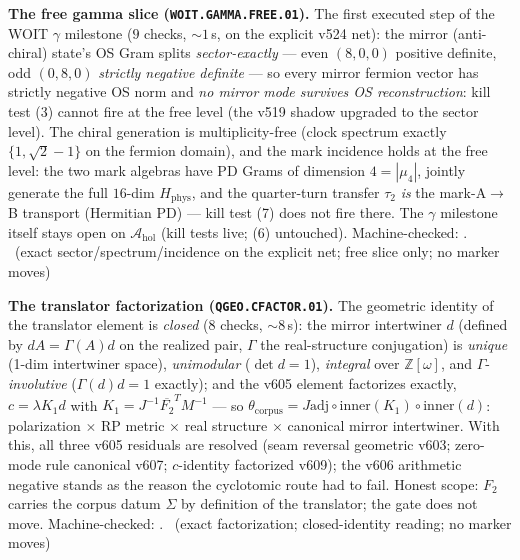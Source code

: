 \documentclass[11pt,a4paper]{article}
\theoremstyle{definition}
\begin{document}
\par\smallskip\noindent\textbf{The free gamma slice
(\texttt{WOIT.GAMMA.FREE.01}).}
The first executed step of the WOIT $\gamma$ milestone ($9$ checks,
${\sim}1$\,s, on the explicit v524 net): the mirror (anti-chiral)
state's OS Gram splits \emph{sector-exactly} --- even $(8,0,0)$
positive definite, odd $(0,8,0)$ \emph{strictly negative definite}
--- so every mirror fermion vector has strictly negative OS norm and
\emph{no mirror mode survives OS reconstruction}: kill test (3)
cannot fire at the free level (the v519 shadow upgraded to the
sector level).  The chiral generation is multiplicity-free (clock
spectrum exactly $\{1,\sqrt2-1\}$ on the fermion domain), and the
mark incidence holds at the free level: the two mark algebras have
PD Grams of dimension $4=|\mu_4|$, jointly generate the full
$16$-dim $H_{\mathrm{phys}}$, and the quarter-turn transfer
$\tau_2$ \emph{is} the mark-A$\to$B transport (Hermitian PD) ---
kill test (7) does not fire there.  The $\gamma$ milestone itself
stays open on $\mathcal A_{\mathrm{hol}}$ (kill tests live; (6)
untouched).
Machine-checked: .
\mE\ (exact sector/spectrum/incidence on the explicit net; free
slice only; no marker moves)
\par\smallskip

\par\smallskip\noindent\textbf{The translator factorization
(\texttt{QGEO.CFACTOR.01}).}
The geometric identity of the translator element is \emph{closed}
($8$ checks, ${\sim}8$\,s): the mirror intertwiner $d$ (defined by
$dA=\Gamma(A)d$ on the realized pair, $\Gamma$ the real-structure
conjugation) is \emph{unique} (1-dim intertwiner space),
\emph{unimodular} ($\det d=1$), \emph{integral} over
$\mathbb{Z}[\omega]$, and $\Gamma$-\emph{involutive}
($\Gamma(d)d=1$ exactly); and the v605 element factorizes exactly,
$c=\lambda K_1d$ with $K_1=J^{-1}\overline{F_2}^TM^{-1}$ --- so
$\theta_{\mathrm{corpus}}=J\mathrm{adj}\circ\mathrm{inner}(K_1)\circ
\mathrm{inner}(d)$: polarization $\times$ RP metric $\times$ real
structure $\times$ canonical mirror intertwiner.  With this, all
three v605 residuals are resolved (seam reversal geometric v603;
zero-mode rule canonical v607; $c$-identity factorized v609); the
v606 arithmetic negative stands as the reason the cyclotomic route
had to fail.  Honest scope: $F_2$ carries the corpus datum $\Sigma$
by definition of the translator; the gate does not move.
Machine-checked: .
\mE\ (exact factorization; closed-identity reading; no marker moves)
\par\smallskip
\end{document}
